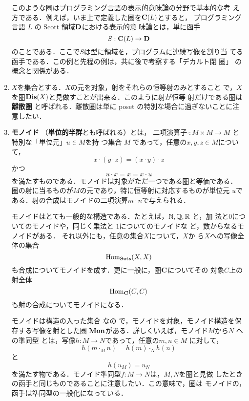 \begin{enumerate}
       このような圏はプログラミング言語の表示的意味論の分野で基本的な考
       え方である．例えば，いま上で定義した圏を${\bf C}(L)$とすると，
       プログラミング言語 $L$ の Scott 領域${\bf D}$における表示的意
       味論とは，単に函手
       \[
	S: {\bf C}(L) \to {\bf D}
       \]
       のことである．ここで$S$は型に領域を，プログラムに連続写像を割り当
       てる函手である．この例と先程の例は，共に後で考察する「デカルト閉
       圏」
       の概念と関係がある．
 \item $X$を集合とする．$X$の元を対象，射をそれらの恒等射のみとすること
       で，$X$を圏${\bf Dis}(X)$と見做すことが出来る．このように射が恒等
       射だけである圏は{\bfseries 離散圏}
       と呼ばれる．離散圏は単に poset
       の特別な場合に過ぎないことに注意したい．
 \item {\bfseries モノイド}
       （{\bfseries 単位的半群}とも呼ばれる）とは，
       二項演算子$\cdot:M\times M \to M$ と特別な「単位元」$u\in M$を持
       つ集合 $M$ であって，任意の$x,y,z \in M$について，
       \[
	x \cdot (y \cdot z) = (x \cdot y) \cdot z
       \]
       かつ
       \[
	u \cdot x = x = x \cdot u
       \]
       を満たすものである．モノイドは対象がただ一つである圏と等価である．
       圏の射に当るものが$M$の元であり，特に恒等射に対応するものが単位元
       $u$である．射の合成はモノイドの二項演算$m \cdot n$で与えられる．

       モノイドはとても一般的な構造である．たとえば，$\mathbb{N}, \mathbb{Q}, \mathbb{R}$ と，加
       法と$0$についてのモノイドや，同じく乗法と $1$についてのモノイドな
       ど，数からなるモノイドがある．
       それ以外にも，任意の集合$X$について，$X$か
       ら$X$への写像全体の集合
       \[
	\mathrm{Hom}_{\mathbf{Sets}}(X,X)
       \]
       も合成についてモノイドを成す．更に一般に，圏${\bf C}$についてその
       対象$C$上の射全体
       \[
	\mathrm{Hom}_{\bf C}(C, C)
       \]
       も射の合成についてモノイドになる．

       モノイドは構造の入った集合
       なの
       で，モノイドを対象，モノイド構造を保存する写像を射とした圏
       $\mathbf{Mon}$がある．詳しくいえば，モノイド$M$から$N$
       への準同型 
       とは，写像$h: M \to N$であって，任意の$m, n \in M$ に対して，
       \[
	h(m \cdot_M n) = h(m) \cdot_N h(n)
       \]
       と
       \[
	h(u_M) = u_N
       \]
       を満たす物である．モノイド準同型$f: M \to N$は，$M, N$を圏と見做
       したときの函手と同じものであることに注意したい．この意味で，圏は
       モノイドの，函手は準同型の一般化になっている．
\end{enumerate}
